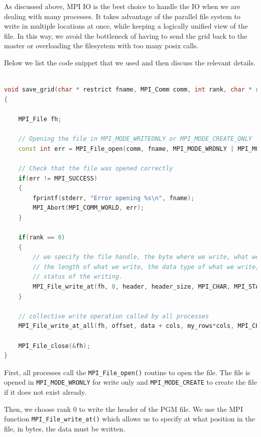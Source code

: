 \documentclass{report}
\begin{document}
As discussed above, MPI IO is the best choice to handle the IO when we are 
dealing with many processes. It takes advantage of the parallel file system 
to write in multiple locations at once, while keeping a logically unified 
view of the file. In this way, we avoid the bottleneck of having to send the grid 
back to the master or overloading the filesystem with too many posix calls.

Below we list the code snippet that we used and then discuss the relevant details. 
\begin{lstlisting}[language=C++]

void save_grid(char * restrict fname, MPI_Comm comm, int rank, char * restrict header, unsigned long int header_size, MPI_Offset offset, unsigned char * restrict data, unsigned long int my_rows, unsigned long int cols)
{

    MPI_File fh;

    // Opening the file in MPI_MODE_WRITEONLY or MPI_MODE_CREATE_ONLY
    const int err = MPI_File_open(comm, fname, MPI_MODE_WRONLY | MPI_MODE_CREATE, MPI_INFO_NULL, &fh);

    // Check that the file was opened correctly
    if(err != MPI_SUCCESS)
    {
        fprintf(stderr, "Error opening %s\n", fname);
        MPI_Abort(MPI_COMM_WORLD, err);
    }
    
    if(rank == 0)
    {
        // we specify the file handle, the byte where we write, what we write, 
        // the length of what we write, the data type of what we write, and the 
        // status of the writing.
        MPI_File_write_at(fh, 0, header, header_size, MPI_CHAR, MPI_STATUS_IGNORE);
    }

    // collective write operation called by all processes
    MPI_File_write_at_all(fh, offset, data + cols, my_rows*cols, MPI_CHAR, MPI_STATUS_IGNORE);

    MPI_File_close(&fh);
}

\end{lstlisting}

First, all processes call the \texttt{MPI\_File\_open()} routine to open the file. 
The file is opened in \texttt{MPI\_MODE\_WRONLY} for write only and 
\texttt{MPI\_MODE\_CREATE} to create the file if it does not exist already.

Then, we choose rank 0 to write the header of the PGM file. We use the MPI function
\texttt{MPI\_File\_write\_at()} which allows us to specify at what position in the 
file, in bytes, the data must be written. 
\end{document}
